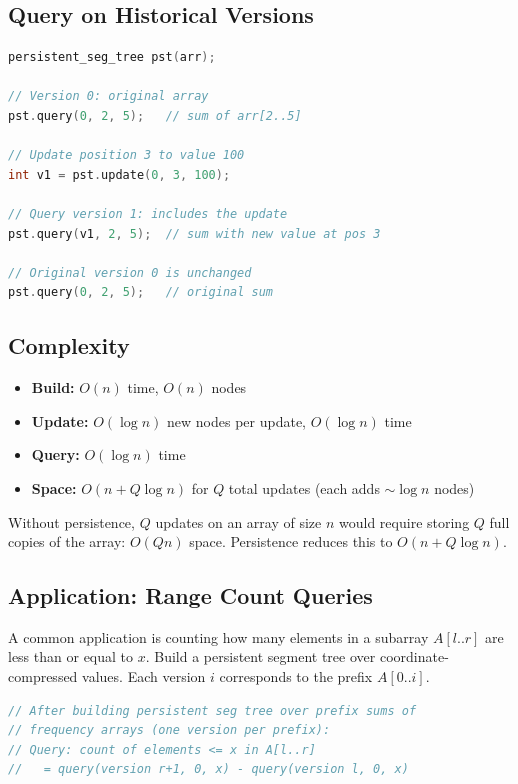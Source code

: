 \subsection{Query on Historical Versions}

\begin{lstlisting}[language=C++]
persistent_seg_tree pst(arr);

// Version 0: original array
pst.query(0, 2, 5);   // sum of arr[2..5]

// Update position 3 to value 100
int v1 = pst.update(0, 3, 100);

// Query version 1: includes the update
pst.query(v1, 2, 5);  // sum with new value at pos 3

// Original version 0 is unchanged
pst.query(0, 2, 5);   // original sum
\end{lstlisting}

\subsection{Complexity}

\begin{itemize}
\item \textbf{Build:} $O(n)$ time, $O(n)$ nodes
\item \textbf{Update:} $O(\log n)$ new nodes per update, $O(\log n)$ time
\item \textbf{Query:} $O(\log n)$ time
\item \textbf{Space:} $O(n + Q \log n)$ for $Q$ total updates (each adds $\sim \log n$ nodes)
\end{itemize}

Without persistence, $Q$ updates on an array of size $n$ would require storing $Q$ full copies of the array: $O(Qn)$ space. Persistence reduces this to $O(n + Q \log n)$.

\subsection{Application: Range Count Queries}

A common application is counting how many elements in a subarray $A[l..r]$ are less than or equal to $x$. Build a persistent segment tree over coordinate-compressed values. Each version $i$ corresponds to the prefix $A[0..i]$.

\begin{lstlisting}[language=C++]
// After building persistent seg tree over prefix sums of
// frequency arrays (one version per prefix):
// Query: count of elements <= x in A[l..r]
//   = query(version r+1, 0, x) - query(version l, 0, x)
\end{lstlisting}

